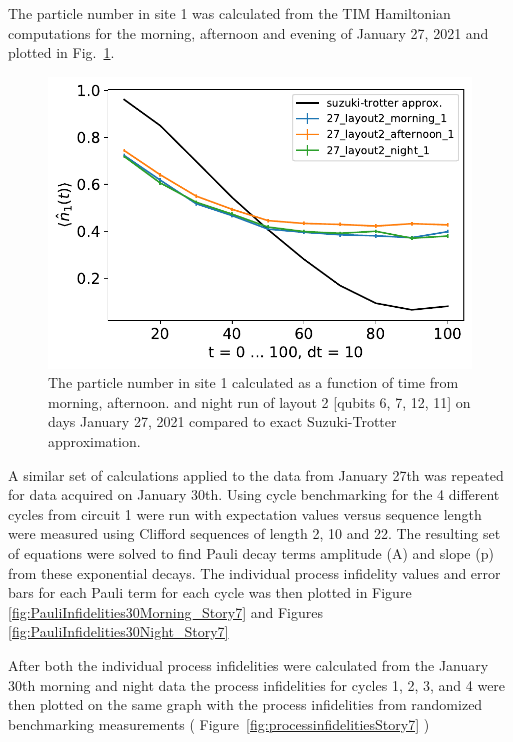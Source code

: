The particle number in site 1 was calculated from the TIM Hamiltonian computations for the morning, afternoon and evening of January 27, 2021 and plotted in Fig.~\ref{fig:n1_Story6}.


\begin{figure}[htpb]
    \includegraphics[scale=0.55]{TIM_[27]_[layout2]_[morning, afternoon, night]_n1.pdf}
    \caption{The particle number in site 1 calculated as a function of time from morning, afternoon. and night run of layout 2 [qubits 6, 7, 12, 11] on days January 27, 2021 compared to exact Suzuki-Trotter approximation.}
    \label{fig:n1_Story6}
\end{figure}





A similar set of calculations applied to the data from January 27th was repeated for data acquired on January 30th.  Using cycle benchmarking for the 4 different cycles from circuit 1 were run with expectation values versus sequence length were measured using Clifford sequences of length 2, 10 and 22.  The resulting set of equations were solved to find Pauli decay terms amplitude (A) and slope (p) from these exponential decays.  The individual process infidelity values and error bars for each Pauli term for each cycle was then plotted in Figure \ref{fig:PauliInfidelities30Morning_Story7} and Figures \ref{fig:PauliInfidelities30Night_Story7}

After both the individual process infidelities were calculated from the January 30th morning and night data the process infidelities for cycles 1, 2, 3, and 4 were then plotted on the same graph with the process infidelities from randomized benchmarking measurements ( Figure~\ref{fig:processinfidelitiesStory7} )

